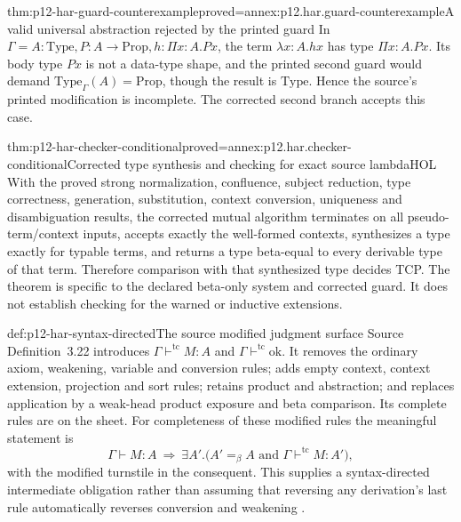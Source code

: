 \begin{hbtheorem}{thm:p12-har-guard-counterexample}{proved=annex:p12.har.guard-counterexample}{A valid universal abstraction rejected by the printed guard}
In \(\Gamma=A:\mathrm{Type},P:A\to\mathrm{Prop},
h:\Pi x:A.Px\), the term \(\lambda x:A.hx\) has type
\(\Pi x:A.Px\). Its body type \(Px\) is not a data-type
shape, and the printed second guard would demand
\(\mathrm{Type}_\Gamma(A)=\mathrm{Prop}\), though the result
is \(\mathrm{Type}\). Hence the source's printed modification
is incomplete. The corrected second branch accepts this case.
\end{hbtheorem}

\begin{hbtheorem}{thm:p12-har-checker-conditional}{proved=annex:p12.har.checker-conditional}{Corrected type synthesis and checking for exact source lambdaHOL}
With the proved strong normalization, confluence, subject
reduction, type correctness, generation, substitution, context conversion,
uniqueness and disambiguation results, the corrected mutual algorithm
terminates on all pseudo-term/context inputs, accepts exactly the
well-formed contexts, synthesizes a type exactly for typable terms, and
returns a type beta-equal to every derivable type of that term. Therefore
comparison with that synthesized type decides TCP. The theorem is
specific to the declared beta-only system and corrected guard. It does
not establish checking for the warned or inductive extensions.
\end{hbtheorem}

\begin{hbdefinition}{def:p12-har-syntax-directed}{The source modified judgment surface}
Source Definition~3.22 introduces \(\Gamma\vdash^{\mathrm{tc}}M:A\)
and \(\Gamma\vdash^{\mathrm{tc}}\mathrm{ok}\). It removes
the ordinary axiom, weakening, variable and conversion rules; adds empty
context, context extension, projection and sort rules; retains product
and abstraction; and replaces application by a weak-head product exposure
and beta comparison. Its complete rules are on the sheet. For completeness
of these modified rules the meaningful statement is
\[
 \Gamma\vdash M:A\ \Longrightarrow\
 \exists A'.\bigl(A'=_\beta A\text{ and }
       \Gamma\vdash^{\mathrm{tc}}M:A'\bigr),
\]
with the modified turnstile in the consequent. This supplies a
syntax-directed intermediate obligation rather than assuming that
reversing any derivation's last rule automatically reverses conversion
and weakening \cite[pp.~1195--1196, Definition~3.22; Proposition~3.23]{BarendregtGeuvers2001}.
\end{hbdefinition}

